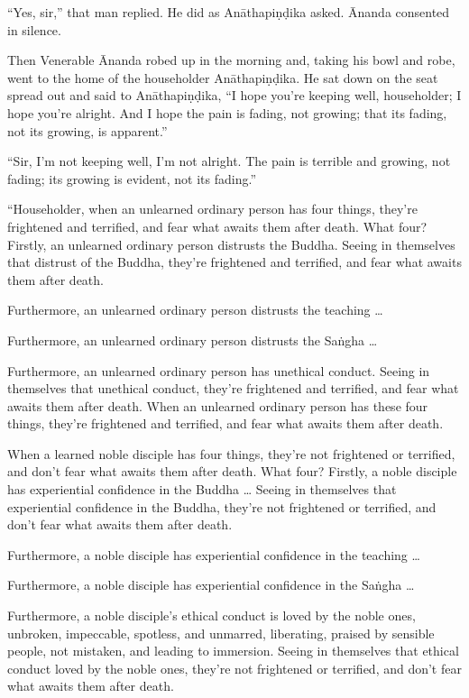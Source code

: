 \documentclass[12pt,openany]{book}%
\begin{document}
“Yes, sir,” that man replied. He did as \textsanskrit{Anāthapiṇḍika} asked. Ānanda consented in silence. 

Then Venerable Ānanda robed up in the morning and, taking his bowl and robe, went to the home of the householder \textsanskrit{Anāthapiṇḍika}. He sat down on the seat spread out and said to \textsanskrit{Anāthapiṇḍika}, “I hope you’re keeping well, householder; I hope you’re alright. And I hope the pain is fading, not growing; that its fading, not its growing, is apparent.” 

“Sir, I’m not keeping well, I’m not alright. The pain is terrible and growing, not fading; its growing is evident, not its fading.” 

“Householder, when an unlearned ordinary person has four things, they’re frightened and terrified, and fear what awaits them after death. What four? Firstly, an unlearned ordinary person distrusts the Buddha. Seeing in themselves that distrust of the Buddha, they’re frightened and terrified, and fear what awaits them after death. 

Furthermore, an unlearned ordinary person distrusts the teaching … 

Furthermore, an unlearned ordinary person distrusts the \textsanskrit{Saṅgha} … 

Furthermore, an unlearned ordinary person has unethical conduct. Seeing in themselves that unethical conduct, they’re frightened and terrified, and fear what awaits them after death. When an unlearned ordinary person has these four things, they’re frightened and terrified, and fear what awaits them after death. 

When a learned noble disciple has four things, they’re not frightened or terrified, and don’t fear what awaits them after death. What four? Firstly, a noble disciple has experiential confidence in the Buddha … Seeing in themselves that experiential confidence in the Buddha, they’re not frightened or terrified, and don’t fear what awaits them after death. 

Furthermore, a noble disciple has experiential confidence in the teaching … 

Furthermore, a noble disciple has experiential confidence in the \textsanskrit{Saṅgha} … 

Furthermore, a noble disciple’s ethical conduct is loved by the noble ones, unbroken, impeccable, spotless, and unmarred, liberating, praised by sensible people, not mistaken, and leading to immersion. Seeing in themselves that ethical conduct loved by the noble ones, they’re not frightened or terrified, and don’t fear what awaits them after death. 
\end{document}
